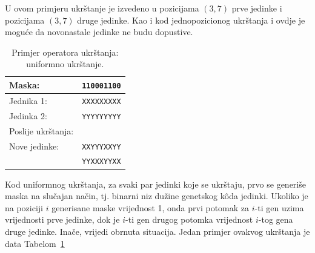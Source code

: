 \documentclass[b5paper, utf8, 11pt, colorlinks]{book}
\theoremstyle{definition}
\begin{document}
U ovom primjeru ukrštanje je izvedeno u pozicijama $(3,7)$ prve jedinke i pozicijama $(3, 7)$ druge jedinke. Kao i kod jednopozicionog ukrštanja i ovdje je moguće da novonastale jedinke ne budu dopustive. 
\begin{table}[H]
	\centering
	
	\begin{tabular}{lc}
		Maska:      &   \verb|110001100|   \\\hline
		Jednika 1:  &	\verb|XXXXXXXXX|   \\ 
		Jedinka 2: &	\verb|YYYYYYYYY|   \\
		Poslije ukrštanja:  &       \\ \hline
		Nove jedinke:            &  \verb|XXYYYXXYY|    \\
		&  \verb|YYXXXYYXX|    \\
	\end{tabular}
	\caption{Primjer operatora ukrštanja: uniformno ukrštanje.}\label{tbl:uniukr}
\end{table}


Kod uniformnog ukrštanja, za svaki par jedinki koje se ukrštaju, prvo se generiše maska na slučajan način, tj. binarni niz dužine genetskog k\^oda jedinki. Ukoliko je na poziciji $i$ generisane maske vrijednost 1, onda prvi potomak za $i$-ti gen uzima vrijednosti prve jedinke, dok je $i$-ti gen drugog potomka vrijednost $i$-tog gena druge jedinke. Inače, vrijedi obrnuta situacija. Jedan primjer ovakvog ukrštanja je data Tabelom~\ref{tbl:uniukr}
\end{document}
